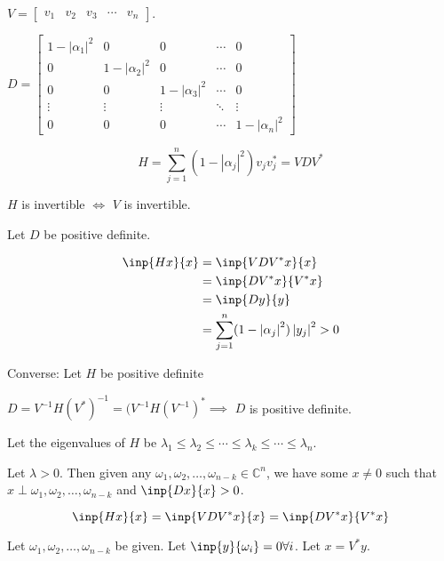 \documentclass[twofold]{article}
\newcommand*\adj[1]{#1^*}
\newcommand*\abs[1]{\left \vert #1 \right\vert}
\theoremstyle{plain}
\theoremstyle{definition}
\theoremstyle{remark}
\begin{document}

\(V = \begin{bmatrix} v_1 & v_2 & v_3 & \cdots & v_n \end{bmatrix} \). 

\(D = \begin{bmatrix} 1 - \abs{\alpha_1}^2 & 0 & 0 & \cdots & 0 \\
0 & 1 - \abs{\alpha_2}^2 & 0 & \cdots & 0 \\
0 & 0 & 1- \abs{\alpha_3}^2 & \cdots & 0 \\
\vdots & \vdots & \vdots & \ddots& \vdots \\
0 & 0 & 0 & \cdots & 1 - \abs{\alpha_n}^2 \end{bmatrix}\)


\[H = \sum_{j = 1} ^n (1 - \abs{\alpha_j}^2) v_j \adj{v_j} = V D \adj{V}\]

\(H\) is invertible \(\iff\) \(V\) is invertible. 

Let \(D\) be positive definite. 

\begin{equation*}\begin{split}
\inp{Hx}{x} & = \inp{VD\adj{V} x}{x} \\
& = \inp{D\adj{V} x}{\adj{V}x} \\
& = \inp{Dy}{y} \\
& = \sum_{j =1}^n (1 - \abs{\alpha_j}^2) \abs{y_j}^2 > 0
\end{split} \end{equation*}


Converse: Let \(H\) be positive definite

\(D = V^{-1} H (\adj{V}) ^{-1} = (V^{-1} H \adj{(V^{-1})} \implies \) \(D\) is positive definite.



Let the eigenvalues of \(H\) be \(\lambda_1 \le \lambda_2 \le \cdots \le \lambda_k \le \cdots \le \lambda_n\).

Let \(\lambda > 0\). Then given any \(\omega_1, \omega_2, \ldots , \omega_{n-k} \in \mathbb{C}^n\), we have some \(x \ne 0\) such that \(x \perp \omega_1, \omega_2 , \ldots , \omega_{n-k}\) and \(\inp{Dx}{x} > 0\).

\[\inp{Hx}{x} = \inp{VD\adj{V} x}{x} = \inp{D\adj{V} x}{\adj{V}x}\]

Let \(\omega_1, \omega_2, \ldots , \omega_{n-k}\) be given. Let \(\inp{y}{\omega_i} = 0 \forall i\). Let \(x = \adj{V}y\). 
\end{document}
